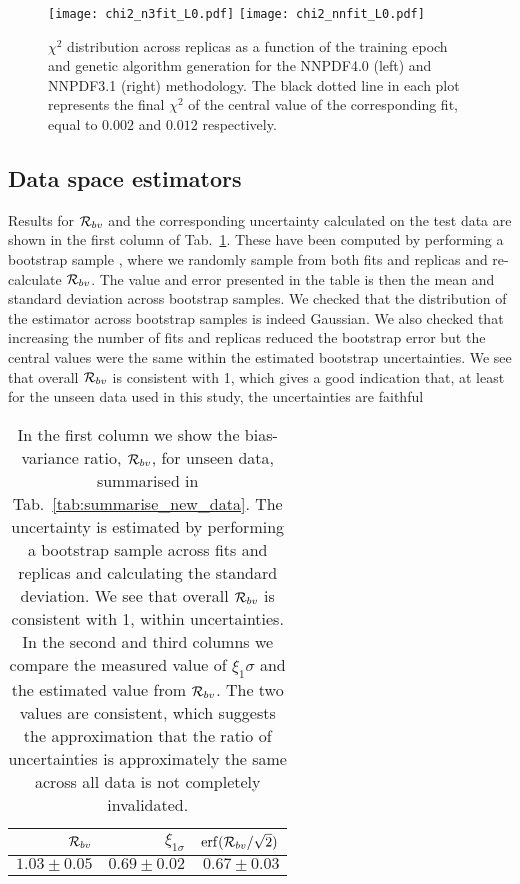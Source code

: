 \begin{figure}[h]
    \centering
    \texttt{[image: chi2\_n3fit\_L0.pdf]}
    \texttt{[image: chi2\_nnfit\_L0.pdf]}
    \caption{$\chi^2$ distribution across replicas as a function of the training
    epoch and genetic algorithm generation for the NNPDF4.0 (left) and NNPDF3.1
    (right) methodology. The black dotted line
    in each plot represents the final $\chi^2$ of the central value of the
    corresponding fit, equal to $0.002$ and $0.012$ respectively.}
    \label{fig:chi2_vs_epoch}    
\end{figure}



\subsection{Data space estimators}

Results for $\mathcal{R}_{bv}$ and the corresponding uncertainty calculated on the
test data are shown in the first column of Tab.~\ref{tab:biasvarratio}. These
have been computed by performing a bootstrap sample
\cite{efron1994introduction}, where we randomly sample from both fits and
replicas and re-calculate $\mathcal{R}_{bv}$. The value and error presented in the
table is then the mean and standard deviation across bootstrap samples. We
checked that the distribution of the estimator across bootstrap samples is
indeed Gaussian. We also checked that increasing the number of fits and replicas
reduced the bootstrap error but the central values were the same within the
estimated bootstrap uncertainties. We see that overall $\mathcal{R}_{bv}$  is
consistent with 1, which gives a good indication that, at least for the unseen
data used in this study, the uncertainties are faithful

\begin{table}[h]
    \begin{center}
        \setlength{\tabcolsep}{12pt} 
        \begin{tabular}{rrr}
            \toprule
             $\mathcal{R}_{bv}$ & $\xi_{1\sigma}$ & ${\rm erf}(\mathcal{R}_{bv}/\sqrt{2})$ \\
            \midrule
             $1.03\pm0.05$ & $0.69\pm0.02$   & $0.67\pm0.03$                  \\
            \bottomrule
            \end{tabular}
    \end{center}
    \caption{In the first column we show the bias-variance ratio,
        $\mathcal{R}_{bv}$, for unseen data, summarised in
        Tab.~\ref{tab:summarise_new_data}. The uncertainty is estimated by
        performing a bootstrap sample across fits and replicas and calculating
        the standard deviation. We see that overall $\mathcal{R}_{bv}$ is
        consistent with 1, within uncertainties. In the second and third
        columns we compare the measured value of $\xi_1\sigma$ and the estimated
        value from $\mathcal{R}_{bv}$. The two values are consistent, which
        suggests the approximation that the ratio of uncertainties is
        approximately the same across all data is not completely invalidated.}
    \label{tab:biasvarratio}
\end{table}

